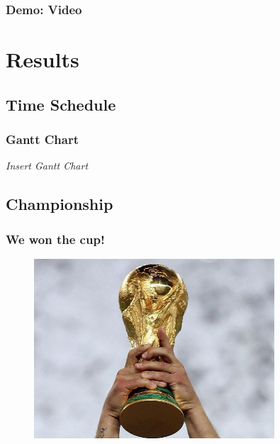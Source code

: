 \documentclass[hyperref={pdfpagelabels=false},compress]{beamer}
\begin{document}
\begin{frame}
    \frametitle{Demo: Video}
	\centering
\end{frame}

\section{Results}
\subsection{Time Schedule}
\begin{frame}
    \frametitle{Gantt Chart}
	\textit{Insert Gantt Chart}
\end{frame}

\subsection{Championship}
\begin{frame}
	\frametitle{We won the cup!}
	\begin{center}
	    \begin{figure}
	        \includegraphics[width=0.8\textwidth]{wm}
	    \end{figure}
	\end{center}
\end{frame}
\end{document}
